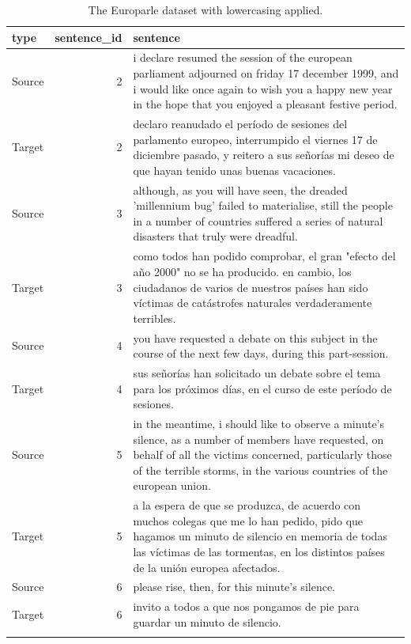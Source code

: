 \documentclass[
  letterpaper,
]{latex/krantz}
\begin{document}
\hypertarget{tbl-normalize-lowercase-europarle}{}
\begin{table}
\caption{\label{tbl-normalize-lowercase-europarle}The Europarle dataset with lowercasing applied. }\tabularnewline

\centering
\begin{tabular}{lrl}
\toprule
type & sentence\_id & sentence\\
\midrule
Source & 2 & i declare resumed the session of the european parliament adjourned on friday 17 december 1999, and i would like once again to wish you a happy new year in the hope that you enjoyed a pleasant festive period.\\
Target & 2 & declaro reanudado el período de sesiones del parlamento europeo, interrumpido el viernes 17 de diciembre pasado, y reitero a sus señorías mi deseo de que hayan tenido unas buenas vacaciones.\\
Source & 3 & although, as you will have seen, the dreaded 'millennium bug' failed to materialise, still the people in a number of countries suffered a series of natural disasters that truly were dreadful.\\
Target & 3 & como todos han podido comprobar, el gran "efecto del año 2000" no se ha producido. en cambio, los ciudadanos de varios de nuestros países han sido víctimas de catástrofes naturales verdaderamente terribles.\\
Source & 4 & you have requested a debate on this subject in the course of the next few days, during this part-session.\\
\addlinespace
Target & 4 & sus señorías han solicitado un debate sobre el tema para los próximos días, en el curso de este período de sesiones.\\
Source & 5 & in the meantime, i should like to observe a minute's silence, as a number of members have requested, on behalf of all the victims concerned, particularly those of the terrible storms, in the various countries of the european union.\\
Target & 5 & a la espera de que se produzca, de acuerdo con muchos colegas que me lo han pedido, pido que hagamos un minuto de silencio en memoria de todas las víctimas de las tormentas, en los distintos países de la unión europea afectados.\\
Source & 6 & please rise, then, for this minute's silence.\\
Target & 6 & invito a todos a que nos pongamos de pie para guardar un minuto de silencio.\\
\addlinespace

\end{tabular}
\end{table}
\end{document}
